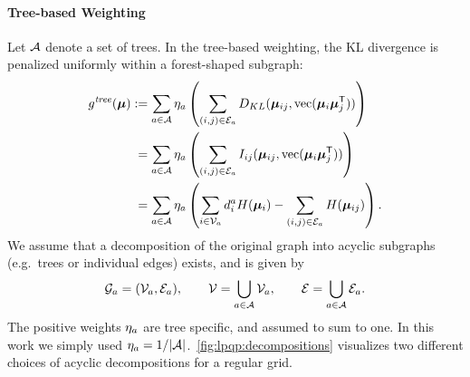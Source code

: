 \paragraph{Tree-based Weighting} Let $\mathcal{A}$ denote a set of trees. In the
tree-based weighting, the
\ac{KL} divergence is penalized uniformly within a
forest-shaped subgraph:
\begin{align}
    g^{\mathit{tree}}(\bm{\mu}) & := \sum_{a \in
    \mathcal{A}} \eta_{a} \left ( \sum_{(i,j) \in
    \mathcal{E}_{a}}
    D_{KL}(\bm{\mu}_{ij}, \mathrm{vec}(\bm{\mu}_{i}
    \bm{\mu}_{j}^{\mathsf{T}})) \right )
    \label{eq:lpqp:penalty_tree}\\
    & \phantom{:} = 
    \sum_{a \in
    \mathcal{A}} \eta_{a} \left ( \sum_{(i,j) \in
    \mathcal{E}_{a}} I_{ij}(\bm{\mu}_{ij},
    \mathrm{vec}(\bm{\mu}_i \bm{\mu}_j^{\mathsf{T}})) \right )\notag\\
    & \phantom{:} = 
    \sum_{a \in
    \mathcal{A}} \eta_{a} \left (
    \sum_{i \in \mathcal{V}_{a}} d_i^{a}H(\bm{\mu}_i)
    -\sum_{(i,j)\in\mathcal{E}_{a}} H(\bm{\mu}_{ij})
    \right)
    .
    \notag
\end{align}
We assume that a decomposition of the original graph into acyclic
subgraphs (e.g.\ trees or individual edges) exists, and is given by
\[
    \mathcal{G}_{a} = (\mathcal{V}_{a}, \mathcal{E}_{a}), \qquad
    \mathcal{V} = \bigcup_{a \in \mathcal{A}} \mathcal{V}_{a}, \qquad
    \mathcal{E} = \bigcup_{a \in \mathcal{A}} \mathcal{E}_{a}.
\]
The positive weights $\eta_{a}$ are tree specific, and assumed to sum
to one. In this work we simply used $\eta_{a} =
1/|{\mathcal{A}}|$.~\autoref{fig:lpqp:decompositions} visualizes two different
choices of acyclic decompositions for a regular grid.
